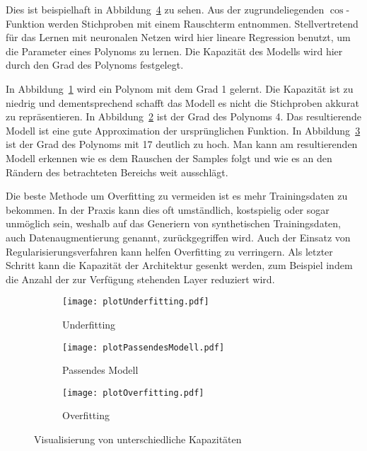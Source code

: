 Dies ist beispielhaft in Abbildung~\ref{fig:capacity} zu sehen.
Aus der zugrundeliegenden \( \cos \)-Funktion werden Stichproben mit einem Rauschterm entnommen. 
Stellvertretend für das Lernen mit neuronalen Netzen wird hier lineare Regression benutzt,
um die Parameter eines Polynoms zu lernen.
Die Kapazität des Modells wird hier durch den Grad des Polynoms festgelegt.

In Abbildung~\ref{subfig:underfitting} wird ein Polynom mit dem Grad 1 gelernt.
Die Kapazität ist zu niedrig und dementsprechend schafft das Modell es nicht die Stichproben akkurat zu repräsentieren.
In Abbildung~\ref{subfig:rightfitting} ist der Grad des Polynoms 4.
Das resultierende Modell ist eine gute Approximation der ursprünglichen Funktion.
In Abbildung~\ref{subfig:overfitting} ist der Grad des Polynoms mit 17 deutlich zu hoch.
Man kann am resultierenden Modell erkennen wie es dem Rauschen der Samples folgt und wie es an den Rändern des betrachteten Bereichs weit ausschlägt.

Die beste Methode um Overfitting zu vermeiden ist es mehr Trainingsdaten zu bekommen.
In der Praxis kann dies oft umständlich, kostspielig oder sogar unmöglich sein, 
weshalb auf das Generiern von synthetischen Trainingsdaten, auch Datenaugmentierung genannt, zurückgegriffen wird.
Auch der Einsatz von Regularisierungsverfahren kann helfen Overfitting zu verringern.
Als letzter Schritt kann die Kapazität der Architektur gesenkt werden,
zum Beispiel indem die Anzahl der zur Verfügung stehenden Layer reduziert wird.

\begin{figure}[h]
    \centering
	
	\begin{subfigure}[t]{0.6\textwidth}
		\texttt{[image: plotUnderfitting.pdf]}
		\caption{Underfitting}
		\label{subfig:underfitting}
	\end{subfigure}
	\begin{subfigure}[t]{0.6\textwidth}
		\texttt{[image: plotPassendesModell.pdf]}
		\caption{Passendes Modell}
		\label{subfig:rightfitting}
	\end{subfigure}
	\begin{subfigure}[t]{0.6\textwidth}
        \texttt{[image: plotOverfitting.pdf]}
		\caption{Overfitting}
		\label{subfig:overfitting}
	\end{subfigure}
	\caption{Visualisierung von unterschiedliche Kapazitäten}
	\label{fig:capacity}
\end{figure}

